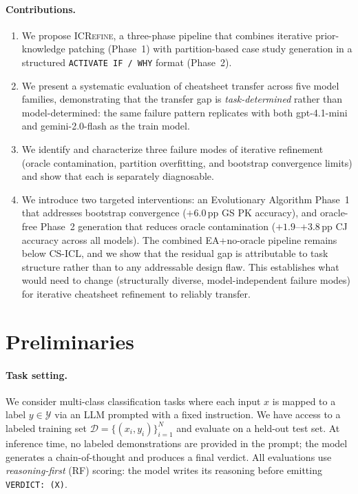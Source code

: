 \documentclass{article}
\begin{document}
\paragraph{Contributions.}
\begin{enumerate}[noitemsep,topsep=2pt]
  \item We propose \textsc{ICRefine}, a three-phase pipeline that combines iterative
        prior-knowledge patching (Phase~1) with partition-based case study generation in a
        structured \texttt{ACTIVATE~IF\,/\,WHY} format (Phase~2).
  \item We present a systematic evaluation of cheatsheet transfer across five model families,
        demonstrating that the transfer gap is \emph{task-determined} rather than
        model-determined: the same failure pattern replicates with both gpt-4.1-mini and
        gemini-2.0-flash as the train model.
  \item We identify and characterize three failure modes of iterative refinement (oracle
        contamination, partition overfitting, and bootstrap convergence limits) and show that
        each is separately diagnosable.
  \item We introduce two targeted interventions: an Evolutionary Algorithm Phase~1 that
        addresses bootstrap convergence ($+6.0$\,pp GS PK accuracy), and oracle-free Phase~2
        generation that reduces oracle contamination ($+1.9$--$+3.8$\,pp CJ accuracy across
        all models).
        The combined EA+no-oracle pipeline remains below CS-ICL, and we show that the residual
        gap is attributable to task structure rather than to any addressable design flaw.
        This establishes what would need to change (structurally diverse, model-independent failure
        modes) for iterative cheatsheet refinement to reliably transfer.
\end{enumerate}




\section{Preliminaries}
\label{sec:prelim}

\paragraph{Task setting.}
We consider multi-class classification tasks where each input $x$ is mapped to a label
$y \in \mathcal{Y}$ via an LLM prompted with a fixed instruction.
We have access to a labeled training set $\mathcal{D} = \{(x_i, y_i)\}_{i=1}^{N}$ and
evaluate on a held-out test set.
At inference time, no labeled demonstrations are provided in the prompt; the model
generates a chain-of-thought and produces a final verdict.
All evaluations use \emph{reasoning-first} (RF) scoring: the model writes its reasoning
before emitting \texttt{VERDICT:~(X)}.
\end{document}
